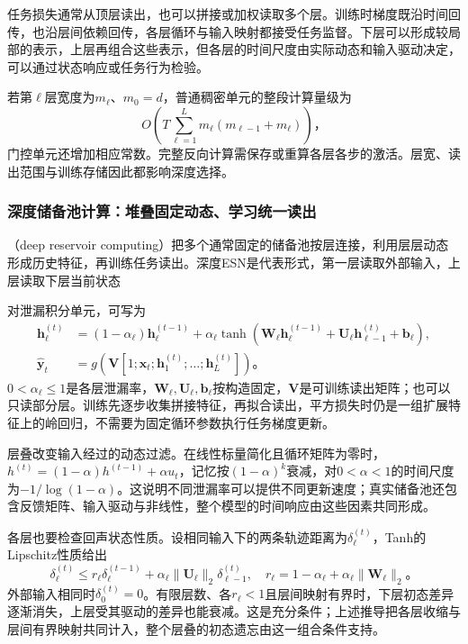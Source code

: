 任务损失通常从顶层读出，也可以拼接或加权读取多个层。训练时梯度既沿时间回传，也沿层间依赖回传，各层循环与输入映射都接受任务监督。下层可以形成较局部的表示，上层再组合这些表示，但各层的时间尺度由实际动态和输入驱动决定，可以通过状态响应或任务行为检验。

若第$\ell$层宽度为$m_\ell$、$m_0=d$，普通稠密单元的整段计算量级为
\begin{equation}
  O\!\left(T\sum_{\ell=1}^{L}m_\ell(m_{\ell-1}+m_\ell)\right)\text{，}
  \label{eq:rnn-stacked-cost}
\end{equation}
门控单元还增加相应常数。完整反向计算需保存或重算各层各步的激活。层宽、读出范围与训练存储因此都影响深度选择。

\subsubsection{深度储备池计算：堆叠固定动态、学习统一读出}
\label{sec:rnn-deep-reservoir}

（deep reservoir computing）把多个通常固定的储备池按层连接，利用层层动态形成历史特征，再训练任务读出。深度ESN是代表形式，第一层读取外部输入，上层读取下层当前状态

对泄漏积分单元，可写为
\begin{equation}
  \begin{aligned}
    \bm h_\ell^{(t)}&=(1-\alpha_\ell)\bm h_\ell^{(t-1)}
      +\alpha_\ell\tanh\!\left(\bm W_\ell\bm h_\ell^{(t-1)}
               +\bm U_\ell\bm h_{\ell-1}^{(t)}+\bm b_\ell\right),\\
    \widehat{\bm y}_t&=g\!\left(\bm V
       [1;\bm x_t;\bm h_1^{(t)};\ldots;\bm h_L^{(t)}]\right)\text{。}
  \end{aligned}
  \label{eq:rnn-deep-esn}
\end{equation}
$0<\alpha_\ell\leq1$是各层泄漏率，$\bm W_\ell,\bm U_\ell,\bm b_\ell$按构造固定，$\bm V$是可训练读出矩阵；也可以只读部分层。训练先逐步收集拼接特征，再拟合读出，平方损失时仍是一组扩展特征上的岭回归，不需要为固定循环参数执行任务梯度更新。

层叠改变输入经过的动态过滤。在线性标量简化且循环矩阵为零时，$h^{(t)}=(1-\alpha)h^{(t-1)}+\alpha u_t$，记忆按$(1-\alpha)^k$衰减，对$0<\alpha<1$的时间尺度为$-1/\log(1-\alpha)$。这说明不同泄漏率可以提供不同更新速度；真实储备池还包含反馈矩阵、输入驱动与非线性，整个模型的时间响应由这些因素共同形成。

各层也要检查回声状态性质。设相同输入下的两条轨迹距离为$\delta_\ell^{(t)}$，Tanh的Lipschitz性质给出
\begin{equation}
  \delta_\ell^{(t)}\leq r_\ell\delta_\ell^{(t-1)}
       +\alpha_\ell\lVert\bm U_\ell\rVert_2\delta_{\ell-1}^{(t)},
  \quad r_\ell=1-\alpha_\ell+\alpha_\ell\lVert\bm W_\ell\rVert_2\text{。}
  \label{eq:rnn-deep-esn-contraction}
\end{equation}
外部输入相同时$\delta_0^{(t)}=0$。有限层数、各$r_\ell<1$且层间映射有界时，下层初态差异逐渐消失，上层受其驱动的差异也能衰减。这是充分条件；上述推导把各层收缩与层间有界映射共同计入，整个层叠的初态遗忘由这一组合条件支持。

